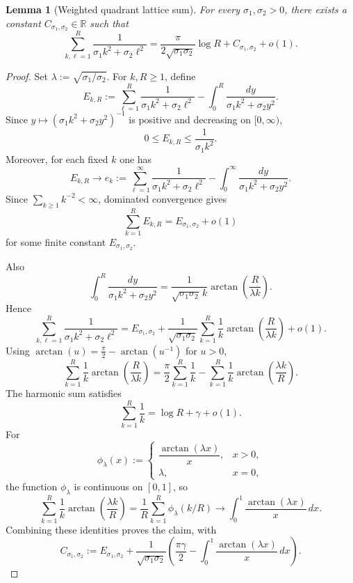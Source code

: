 \documentclass[reqno]{amsart}
\numberwithin{equation}{section}
\newtheorem{lemma}[lemma]{Lemma}
\theoremstyle{definition}
\theoremstyle{remark}
\begin{document}
\begin{lemma}[Weighted quadrant lattice sum]\label{lem:weighted_lattice_sum}
For every $\sigma_1,\sigma_2>0$, there exists a constant $C_{\sigma_1,\sigma_2}\in\mathbb R$ such that
\[
  \sum_{k,\ell=1}^R \frac{1}{\sigma_1 k^2+\sigma_2 \ell^2}
  =
  \frac{\pi}{2\sqrt{\sigma_1\sigma_2}}\log R
  + C_{\sigma_1,\sigma_2}
  + o(1).
\]
\end{lemma}

\begin{proof}
Set $\lambda:=\sqrt{\sigma_1/\sigma_2}$. For $k,R\ge1$, define
\[
  E_{k,R}
  :=
  \sum_{\ell=1}^R \frac{1}{\sigma_1 k^2+\sigma_2 \ell^2}
  -
  \int_0^R \frac{dy}{\sigma_1 k^2+\sigma_2 y^2}.
\]
Since $y\mapsto (\sigma_1 k^2+\sigma_2 y^2)^{-1}$ is positive and decreasing on $[0,\infty)$,
\[
  0\le E_{k,R}\le \frac{1}{\sigma_1 k^2}.
\]
Moreover, for each fixed $k$ one has
\[
  E_{k,R}\longrightarrow
  e_k
  :=
  \sum_{\ell=1}^\infty \frac{1}{\sigma_1 k^2+\sigma_2 \ell^2}
  -
  \int_0^\infty \frac{dy}{\sigma_1 k^2+\sigma_2 y^2}.
\]
Since $\sum_{k\ge1} k^{-2}<\infty$, dominated convergence gives
\[
  \sum_{k=1}^R E_{k,R}
  =
  E_{\sigma_1,\sigma_2}+o(1)
\]
for some finite constant $E_{\sigma_1,\sigma_2}$.

Also
\[
  \int_0^R \frac{dy}{\sigma_1 k^2+\sigma_2 y^2}
  =
  \frac{1}{\sqrt{\sigma_1\sigma_2}\,k}\arctan\!\left(\frac{R}{\lambda k}\right).
\]
Hence
\[
  \sum_{k,\ell=1}^R \frac{1}{\sigma_1 k^2+\sigma_2 \ell^2}
  =
  E_{\sigma_1,\sigma_2}
  +
  \frac{1}{\sqrt{\sigma_1\sigma_2}}
  \sum_{k=1}^R \frac1k \arctan\!\left(\frac{R}{\lambda k}\right)
  + o(1).
\]
Using $\arctan(u)=\frac{\pi}{2}-\arctan(u^{-1})$ for $u>0$,
\[
  \sum_{k=1}^R \frac1k \arctan\!\left(\frac{R}{\lambda k}\right)
  =
  \frac{\pi}{2}\sum_{k=1}^R \frac1k
  -
  \sum_{k=1}^R \frac1k \arctan\!\left(\frac{\lambda k}{R}\right).
\]
The harmonic sum satisfies
\[
  \sum_{k=1}^R \frac1k = \log R+\gamma+o(1).
\]
For
\[
  \phi_\lambda(x):=
  \begin{cases}
    \dfrac{\arctan(\lambda x)}{x}, & x>0,\\[2mm]
    \lambda, & x=0,
  \end{cases}
\]
the function $\phi_\lambda$ is continuous on $[0,1]$, so
\[
  \sum_{k=1}^R \frac1k \arctan\!\left(\frac{\lambda k}{R}\right)
  =
  \frac1R\sum_{k=1}^R \phi_\lambda(k/R)
  \longrightarrow
  \int_0^1 \frac{\arctan(\lambda x)}{x}\,dx.
\]
Combining these identities proves the claim, with
\[
  C_{\sigma_1,\sigma_2}
  :=
  E_{\sigma_1,\sigma_2}
  +
  \frac{1}{\sqrt{\sigma_1\sigma_2}}
  \left(
    \frac{\pi\gamma}{2}
    -
    \int_0^1 \frac{\arctan(\lambda x)}{x}\,dx
  \right).
\]
\end{proof}
\end{document}
